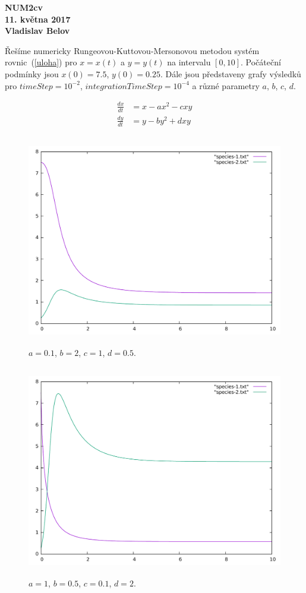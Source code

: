 \documentclass[11pt,american,czech]{article}
\begin{document}
\def\documentdate{11. května 2017}
\begin{flushright}
\textbf{	NUM2cv \\
	11. května 2017 \\
	Vladislav Belov}
\end{flushright}

Řešíme numericky Rungeovou-Kuttovou-Mersonovou metodou systém rovnic~(\ref{uloha}) pro $x=x(t)$ a $y=y(t)$ na intervalu $[0, 10]$. Počáteční podmínky jsou $x(0)=7.5$, $y(0)=0.25$. Dále jsou představeny grafy výsledků pro $timeStep=10^{-2}$, $integrationTimeStep=10^{-4}$ a různé parametry $a$, $b$, $c$, $d$.

\begin{equation}
	\label{uloha}
	\begin{split}
		\frac{dx}{dt} &= x-ax^2-cxy \\
		\frac{dy}{dt} &= y-by^2+dxy
	\end{split}
\end{equation}

\begin{figure}[ht!]
\centering
\includegraphics[height=9.25cm]{Figs/pokus_1}
\caption{$a=0.1$, $b=2$, $c=1$, $d=0.5$.}
\end{figure}

\begin{figure}[ht!]
\centering
\includegraphics[height=9.25cm]{Figs/pokus_2}
\caption{$a=1$, $b=0.5$, $c=0.1$, $d=2$.}
\end{figure}
\end{document}
